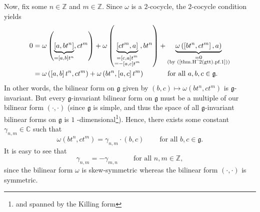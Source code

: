 \documentclass
[numbers=enddot,12pt,final,onecolumn,german,notitlepage]{scrartcl}%
\theoremstyle{definition}
\begin{document}
Now, fix some $n\in\mathbb{Z}$ and $m\in\mathbb{Z}$. Since $\omega$ is a
$2$-cocycle, the $2$-cocycle condition yields%
\begin{align*}
0  &  =\omega\left(  \underbrace{\left[  a,bt^{n}\right]  }_{=\left[
a,b\right]  t^{n}},ct^{m}\right)  +\omega\left(  \underbrace{\left[
ct^{m},a\right]  }_{\substack{=\left[  c,a\right]  t^{m}\\=-\left[
a,c\right]  t^{m}}},bt^{n}\right)  +\underbrace{\omega\left(  \left[
bt^{n},ct^{m}\right]  ,a\right)  }_{\substack{=0\\\text{(by
(\ref{thm.H^2(gtt).pf.1}))}}}\\
&  =\omega\left(  \left[  a,b\right]  t^{n},ct^{m}\right)  +\omega\left(
bt^{n},\left[  a,c\right]  t^{m}\right)  \ \ \ \ \ \ \ \ \ \ \text{for all
}a,b,c\in\mathfrak{g}\text{.}%
\end{align*}
In other words, the bilinear form on $\mathfrak{g}$ given by $\left(
b,c\right)  \mapsto\omega\left(  bt^{n},ct^{m}\right)  $ is $\mathfrak{g}%
$-invariant. But every $\mathfrak{g}$-invariant bilinear form on
$\mathfrak{g}$ must be a multiple of our bilinear form $\left(  \cdot
,\cdot\right)  $ (since $\mathfrak{g}$ is simple, and thus the space of all
$\mathfrak{g}$-invariant bilinear forms on $\mathfrak{g}$ is $1$%
-dimensional\footnote{and spanned by the Killing form}). Hence, there exists
some constant $\gamma_{n,m}\in\mathbb{C}$ such that
\begin{equation}
\omega\left(  bt^{n},ct^{m}\right)  =\gamma_{n,m}\cdot\left(  b,c\right)
\ \ \ \ \ \ \ \ \ \ \text{for all }b,c\in\mathfrak{g}.
\label{thm.H^2(gtt).pf.2}%
\end{equation}
It is easy to see that%
\begin{equation}
\gamma_{n,m}=-\gamma_{m,n}\ \ \ \ \ \ \ \ \ \ \text{for all }n,m\in\mathbb{Z},
\label{thm.H^2(gtt).pf.3}%
\end{equation}
since the bilinear form $\omega$ is skew-symmetric whereas the bilinear form
$\left(  \cdot,\cdot\right)  $ is symmetric.
\end{document}
